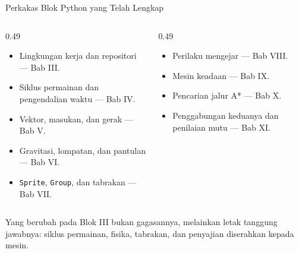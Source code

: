\documentclass[aspectratio=169,10pt]{beamer}
\begin{document}
\begin{frame}{Perkakas Blok Python yang Telah Lengkap}
\begin{columns}[T,onlytextwidth]
  \begin{column}{0.49\textwidth}
    {\scriptsize
    \begin{itemize}
      \item Lingkungan kerja dan repositori --- Bab III.
      \item Siklus permainan dan pengendalian waktu --- Bab IV.
      \item Vektor, masukan, dan gerak --- Bab V.
      \item Gravitasi, lompatan, dan pantulan --- Bab VI.
      \item \texttt{Sprite}, \texttt{Group}, dan tabrakan --- Bab VII.
    \end{itemize}}
  \end{column}
  \begin{column}{0.49\textwidth}
    {\scriptsize
    \begin{itemize}
      \item Perilaku mengejar --- Bab VIII.
      \item Mesin keadaan --- Bab IX.
      \item Pencarian jalur A* --- Bab X.
      \item Penggabungan keduanya dan penilaian mutu --- Bab XI.
    \end{itemize}}
  \end{column}
\end{columns}
\vspace{0.16cm}
\begin{kotak}
Yang berubah pada Blok III bukan gagasannya, melainkan letak tanggung jawabnya:
siklus permainan, fisika, tabrakan, dan penyajian diserahkan kepada mesin.
\end{kotak}
\end{frame}
\end{document}
